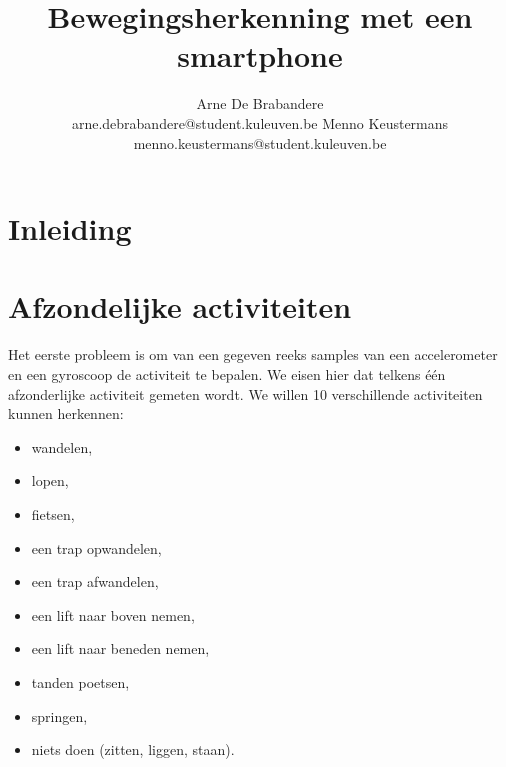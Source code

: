 \documentclass{article}
\title{Bewegingsherkenning met een smartphone}
\author{Arne De Brabandere\\
	arne.debrabandere@student.kuleuven.be
    \And
    Menno Keustermans\\
    menno.keustermans@student.kuleuven.be}
\begin{document}
\maketitle

\begin{abstract}


\end{abstract}

\section{Inleiding}





\section{Afzondelijke activiteiten}

Het eerste probleem is om van een gegeven reeks samples van een accelerometer en een gyroscoop de activiteit te bepalen. We eisen hier dat telkens \'e\'en afzonderlijke activiteit gemeten wordt. We willen 10 verschillende activiteiten kunnen herkennen:
\begin{itemize}
\item wandelen,
\item lopen,
\item fietsen,
\item een trap opwandelen,
\item een trap afwandelen,
\item een lift naar boven nemen,
\item een lift naar beneden nemen,
\item tanden poetsen,
\item springen,
\item niets doen (zitten, liggen, staan).
\end{itemize}
\end{document}
